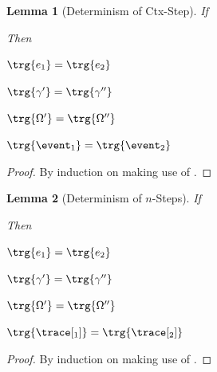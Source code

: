 \documentclass[a4paper,names,dvipsnames]{article}
\newtheorem{lemma}{Lemma}
\begin{document}
\begin{lemma}[Determinism of Ctx-Step]\label{lem:determ:ctxstep}
  If
  Then
  \begin{goals}
  \item $\trg{e_{1}}=\trg{e_{2}}$
  \item $\trg{\gamma'}=\trg{\gamma''}$
  \item $\trg{\Omega'}=\trg{\Omega''}$
  \item $\trg{\event_{1}}=\trg{\event_{2}}$
  \end{goals}
\end{lemma}
\begin{proof}
  By induction on  making use of .
\end{proof}

\begin{lemma}[Determinism of $n$-Steps]\label{lem:determ:nsteps}
  If
  Then
  \begin{goals}
  \item $\trg{e_{1}}=\trg{e_{2}}$
  \item $\trg{\gamma'}=\trg{\gamma''}$
  \item $\trg{\Omega'}=\trg{\Omega''}$
  \item $\trg{\trace[_{1}]}=\trg{\trace[_{2}]}$
  \end{goals}
\end{lemma}
\begin{proof}
  By induction on  making use of .
\end{proof}
\end{document}
